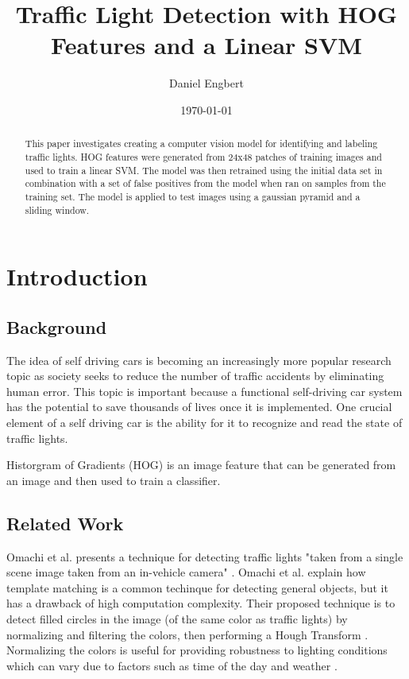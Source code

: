 \documentclass[a4paper]{article}
\title{Traffic Light Detection with HOG Features and a Linear SVM}
\author{Daniel Engbert}
\date{\today}
\begin{document}
\maketitle

\begin{abstract}
    This paper investigates creating a computer vision model for identifying and labeling traffic lights.  HOG features were generated from 24x48 patches of training images and used to train a linear SVM.  The model was then retrained using the initial data set in combination with a set of false positives from the model when ran on samples from the training set.  The model is applied to test images using a gaussian pyramid and a sliding window.
\end{abstract}

\section{Introduction}
\label{sec:theory}
\subsection{Background}
The idea of self driving cars is becoming an increasingly more popular research topic as society seeks to reduce the number of traffic accidents by eliminating human error.  This topic is important because a functional self-driving car system has the potential to save thousands of lives once it is implemented.  One crucial element of a self driving car is the ability for it to recognize and read the state of traffic lights.

Historgram of Gradients (HOG) is an image feature that can be generated from an image and then used to train a classifier.


\subsection{Related Work}
Omachi et al. presents a technique for detecting traffic lights "taken from a single scene image taken from an in-vehicle camera" \cite{omachi}.  Omachi et al. explain how template matching is a common techinque for detecting general objects, but it has a drawback of high computation complexity.  Their proposed technique is to detect filled circles in the image (of the same color as traffic lights) by normalizing and filtering the colors, then performing a Hough Transform \cite{omachi}.  Normalizing the colors is useful for providing robustness to lighting conditions which can vary due to factors such as time of the day and weather \cite{omachi}.
\end{document}
